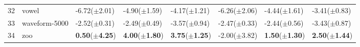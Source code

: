 \begin{table}[!tbp]
\begin{center}
\begin{tabular}{llllllll}
32&vowel& -6.72($\pm$2.01)& -4.90($\pm$1.59)& -4.17($\pm$1.21)& -6.26($\pm$2.06)& -4.44($\pm$1.61)& -3.41($\pm$0.83)\tabularnewline
33&waveform-5000& -2.52($\pm$0.31)& -2.49($\pm$0.49)& -3.57($\pm$0.94)& -2.47($\pm$0.33)& -2.44($\pm$0.56)& -3.43($\pm$0.87)\tabularnewline
34&zoo&\textbf{  0.50}($\pm$\textbf{4.25})&\textbf{  4.00}($\pm$\textbf{1.80})&\textbf{  3.75}($\pm$\textbf{1.25})& -2.00($\pm$3.82)&\textbf{  1.50}($\pm$\textbf{1.30})&\textbf{  2.50}($\pm$\textbf{1.44})\tabularnewline
\hline
\end{tabular}\end{center}

\end{table}
